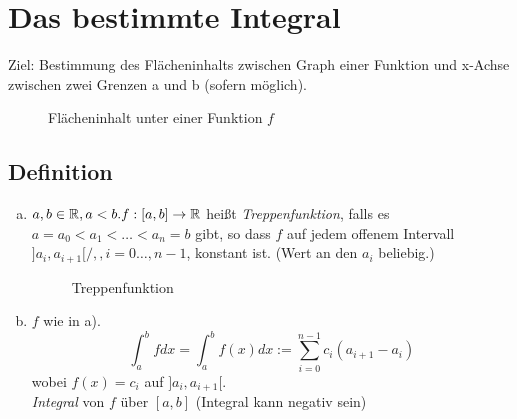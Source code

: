 	\section{Das bestimmte Integral}
	Ziel: Bestimmung des Flächeninhalts zwischen Graph einer Funktion und x-Achse zwischen zwei Grenzen a und b (sofern möglich).
	\begin{figure}[h!]
		\centering
		\caption{Flächeninhalt unter einer Funktion $f$}
	\end{figure}
	\subsection{Definition}
	\begin{enumerate}[a)]
		\item $a,b \in \mathbb{R}, a<b. f:[a,b] \to \mathbb{R}$ hei\ss t \emph{Treppenfunktion}, falls es $ a = a_0 < a_1 < \ldots < a_n = b$ gibt, so dass $f$ auf jedem offenem Intervall $]a_i,a_{i+1}[/, , i= 0 \ldots, n-1 $, konstant ist. (Wert an den $a_i$ beliebig.)\\
	\begin{figure}[h!]
		\centering
		\caption{Treppenfunktion}
	\end{figure}
		\item $f$ wie in a).
		\[ \int_a^b fdx = \int_a^b f(x)dx := \sum_{i=0}^{n-1} c_i (a_{i+1} -a_i) \]
		wobei $f(x) = c_i$ auf $]a_i, a_{i+1}[.$\\
		\emph{Integral} von $f$ über $[a,b]$ (Integral kann negativ sein)
	\end{enumerate}
